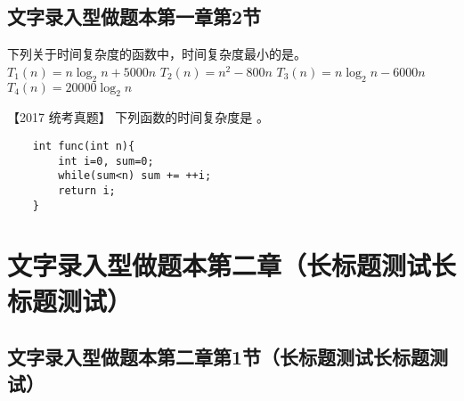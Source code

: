 \documentclass[standard]{ExBook}
\begin{document}
\subsection{文字录入型做题本第一章第2节}
 
\begin{qitems}

    \begin{bbox}
        \qitem   下列关于时间复杂度的函数中，时间复杂度最小的是\blankbox 。
        \fourchoices
        {$T_1(n)=n\log_2n +5000n$}
        {$T_2(n)=n^2 - 800n$}
        {$T_3(n)=n\log_2n - 6000n$}
        {$T_4(n)=20000\log_2n$}
    \end{bbox}

    \begin{bbox}
        \qitem   【2017 统考真题】 下列函数的时间复杂度是 \blankbox 。
        \begin{lstlisting}
    int func(int n){
        int i=0, sum=0;
        while(sum<n) sum += ++i;
        return i; 
    }
        \end{lstlisting}
    \end{bbox}

\end{qitems}

\section{文字录入型做题本第二章（长标题测试长标题测试）}
\subsection{文字录入型做题本第二章第1节（长标题测试长标题测试）}
\end{document}
